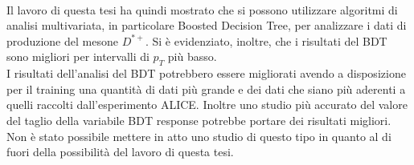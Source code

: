 \\Il lavoro di questa tesi ha quindi mostrato che si possono utilizzare algoritmi di analisi multivariata, in particolare Boosted Decision Tree, per analizzare i dati di produzione del mesone $D^{*+}$. Si è evidenziato, inoltre, che i risultati del BDT sono migliori per intervalli di $p_T$ più basso. 
\\I risultati dell'analisi del BDT potrebbero essere migliorati avendo a disposizione per il training una quantità di dati più grande e dei dati che siano più aderenti a quelli raccolti dall'esperimento ALICE. Inoltre uno studio più accurato del valore del taglio della variabile BDT response potrebbe portare dei risultati migliori. Non è stato possibile mettere in atto uno studio di questo tipo in quanto al di fuori della possibilità del lavoro di questa tesi. 
